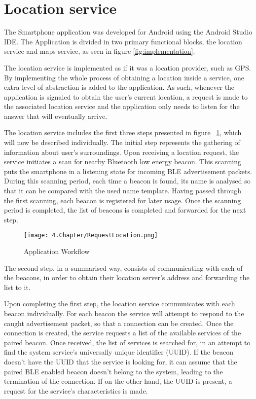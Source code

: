 \section{Location service} 
\label{sec:LocService} 
 
 
The Smartphone application was developed for Android using the Android Studio IDE. The Application is divided in two primary functional blocks, the location service and maps service, as seen in figure \ref{fig:implementation}. 
 
 
The location service is implemented as if it was a location provider, such as GPS. By implementing the whole process of obtaining a location inside a service, one extra level of abstraction is added to the application. As such, whenever the application is signaled to obtain the user's current location, a request is made to the associated location service and the application only needs to listen for the answer that will eventually arrive. 
 
 
 
 
 
 
The location service includes the first three steps presented in figure ~\ref{fig:MockProvider}, which will now be described individually. The initial step represents the gathering of information about user's surroundings. Upon receiving a location request, the service initiates a scan for nearby Bluetooth low energy beacon. This scanning puts the smartphone in a listening state for incoming \ac{BLE} advertisement packets. During this scanning period, each time a beacon is found, its name is analysed so that it can be compared with the used name template. Having passed through the first scanning, each beacon is registered for later usage. Once the scanning period is completed, the list of beacons is completed and forwarded for the next step. 
 
 
\begin{figure}[H] 
\centering 
\texttt{[image: 4.Chapter/RequestLocation.png]} 
\caption[Application Workflow]{Application Workflow} 
\label{fig:MockProvider} 
\end{figure} 
 
 
The second step, in a summarised way, consists of communicating with each of the beacons, in order to obtain their location server's address and forwarding the list to it.  
 
 
Upon completing the first step, the location service communicates with each beacon individually. For each beacon the service will attempt to respond to the caught advertisement packet, so that a connection can be created. Once the connection is created, the service requests a list of the available services of the paired beacon. 
Once received, the list of services is searched for, in an attempt to find the system service's universally unique identifier (UUID). If the beacon doesn't have the UUID that the service is looking for, it can assume that the paired \ac{BLE} enabled beacon doesn't belong to the system, leading to the termination of the connection. If on the other hand, the UUID is present, a request for the service's characteristics is made.  
 
